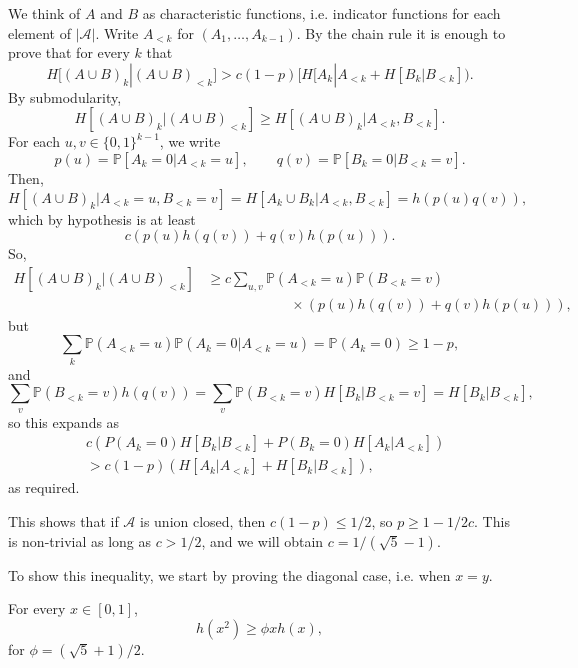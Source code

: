 \documentclass[12pt]{article}
\begin{document}
\begin{proofbox}
	We think of $A$ and $B$ as characteristic functions, i.e. indicator functions for each element of $|\mathcal{A}|$. Write $A_{<k}$ for $(A_1, \ldots, A_{k-1})$. By the chain rule it is enough to prove that for every $k$ that
	\[
		H[(A \cup B)_{k}|(A \cup B)_{< k}] > c(1 - p)[H[A_k|A_{<k} + H[B_k|B_{<k}]).
	\]
	By submodularity,
	\[
		H[(A \cup B)_k|(A \cup B)_{<k}] \geq H[(A \cup B)_k|A_{<k}, B_{<k}].
	\]
	For each $u, v \in \{0, 1\}^{k-1}$, we write
	\[
		p(u) = \mathbb{P}[A_k = 0 | A_{<k} = u], \qquad q(v) = \mathbb{P}[B_k = 0 | B_{<k} = v].
	\]
	Then,
	\[
		H[(A \cup B)_k | A_{<k} = u, B_{<k} = v] = H[A_k \cup B_k | A_{<k}, B_{<k}] = h(p(u) q(v)),
	\]
	which by hypothesis is at least
	\[
	c(p(u) h(q(v)) + q(v) h(p(u))).
	\]
	So,
	\begin{align*}
		H[(A \cup B)_k | (A \cup B)_{<k}] &\geq c \sum_{u, v} \mathbb{P}(A_{<k} = u) \mathbb{P}(B_{<k} = v) \\
						  & \qquad \qquad \qquad \times (p(u) h(q(v)) + q(v) h(p(u))),
	\end{align*}
	but
	\[
	\sum_{k} \mathbb{P}(A_{<k} = u) \mathbb{P}(A_k = 0 | A_{<k} = u) = \mathbb{P}(A_k = 0) \geq 1 - p,
	\]
	and
	\[
		\sum_v \mathbb{P}(B_{<k} = v) h(q(v)) = \sum_v \mathbb{P}(B_{<k} = v) H[B_k | B_{<k} = v] = H[B_k | B_{<k}],
	\]
	so this expands as
	\begin{align*}
		& c(P(A_k = 0) H[B_k | B_{<k}] + P(B_k = 0) H[A_k|A_{<k}]) \\
		&> c(1-p)(H[A_k|A_{<k}] + H[B_k|B_{<k}]),
	\end{align*}
	as required.
\end{proofbox}

This shows that if $\mathcal{A}$ is union closed, then $c(1-p) \leq 1/2$, so $p \geq 1 - 1/2c$. This is non-trivial as long as $c > 1/2$, and we will obtain $c = 1/(\sqrt 5 - 1)$.

To show this inequality, we start by proving the diagonal case, i.e. when $x = y$.

\begin{lemma}[Boppana]
	For every $x \in [0, 1]$,
	\[
	h(x^2) \geq \phi x h(x),
	\]
	for $\phi = (\sqrt 5 + 1)/2$.
\end{lemma}
\end{document}
